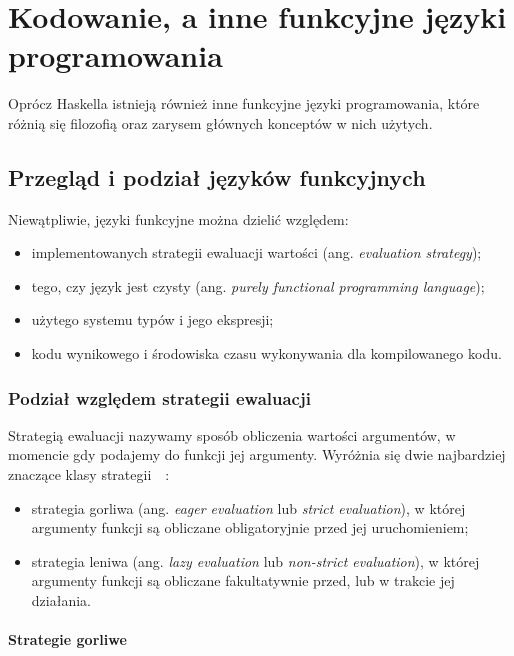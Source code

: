 \documentclass[../praca.tex]{subfiles}
\begin{document}
\chapter{Kodowanie, a inne funkcyjne języki programowania}

Oprócz Haskella istnieją również inne funkcyjne języki programowania, które 
różnią się filozofią oraz zarysem głównych konceptów w nich użytych.

\section{Przegląd i podział języków funkcyjnych}

Niewątpliwie, języki funkcyjne można dzielić względem:
\begin{itemize}
  \item implementowanych strategii ewaluacji wartości (ang. \emph{evaluation strategy});
  \item tego, czy język jest czysty (ang. \emph{purely functional programming language});
  \item użytego systemu typów i jego ekspresji;
  \item kodu wynikowego i środowiska czasu wykonywania dla kompilowanego kodu. 
\end{itemize}

\subsection{Podział względem strategii ewaluacji}

Strategią ewaluacji nazywamy sposób obliczenia wartości argumentów, w momencie gdy
podajemy do funkcji jej argumenty. Wyróżnia się dwie najbardziej znaczące
klasy strategii~\cite{Abelson:SICP}~\cite{Pierce:TPL}:

\begin{itemize}
  \item strategia gorliwa (ang. \emph{eager evaluation} lub \emph{strict evaluation}),
    w której argumenty funkcji są obliczane obligatoryjnie 
    przed jej uruchomieniem;
  \item strategia leniwa (ang. \emph{lazy evaluation} lub \emph{non-strict evaluation}),
    w której argumenty funkcji są obliczane fakultatywnie przed, lub w trakcie jej 
    działania.
\end{itemize}

\subsubsection{Strategie gorliwe}
\end{document}
